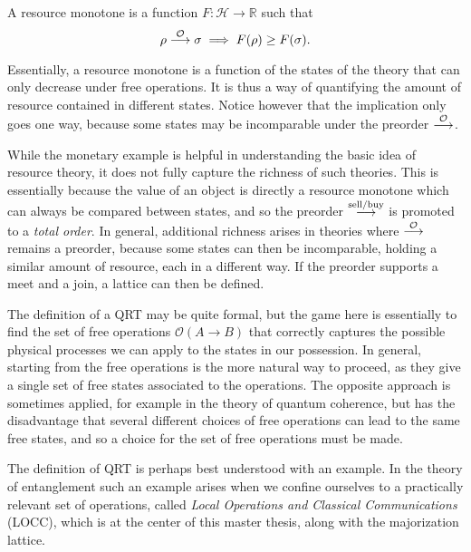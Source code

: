 \begin{definition}
    A resource monotone is a function $F: \mathcal{H} \rightarrow \mathbb{R}$ such that
    \begin{equation}
        \rho \overset{\mathcal{O}}{\longrightarrow} \sigma \implies F(\rho) \geq F(\sigma).
    \end{equation}
\end{definition}

Essentially, a resource monotone is a function of the states of the theory that can only decrease under free operations. It is thus a way of quantifying the amount of resource contained in different states. Notice however that the implication only goes one way, because some states may be incomparable under the preorder $\overset{\mathcal{O}}{\longrightarrow}$.

\begin{remark}
    While the monetary example is helpful in understanding the basic idea of resource theory, it does not fully capture the richness of such theories. This is essentially because the value of an object is directly a resource monotone which can always be compared between states, and so the preorder $\overset{\text{sell/buy}}{\longrightarrow}$ is promoted to a \textit{total order}. In general, additional richness arises in theories where $\overset{\mathcal{O}}{\longrightarrow}$ remains a preorder, because some states can then be incomparable, holding a similar amount of resource, each in a different way. If the preorder supports a meet and a join, a lattice can then be defined. 
\end{remark}

The definition of a QRT may be quite formal, but the game here is essentially to find the set of free operations $\mathcal{O}(A \rightarrow B)$ that correctly captures the possible physical processes we can apply to the states in our possession. In general, starting from the free operations is the more natural way to proceed, as they give a single set of free states associated to the operations. The opposite approach is sometimes applied, for example in the theory of quantum coherence, but has the disadvantage that several different choices of free operations can lead to the same free states, and so a choice for the set of free operations must be made.

The definition of QRT is perhaps best understood with an example. In the theory of entanglement such an example arises when we confine ourselves to a practically relevant set of operations, called \textit{Local Operations and Classical Communications} (LOCC), which is at the center of this master thesis, along with the majorization lattice.


